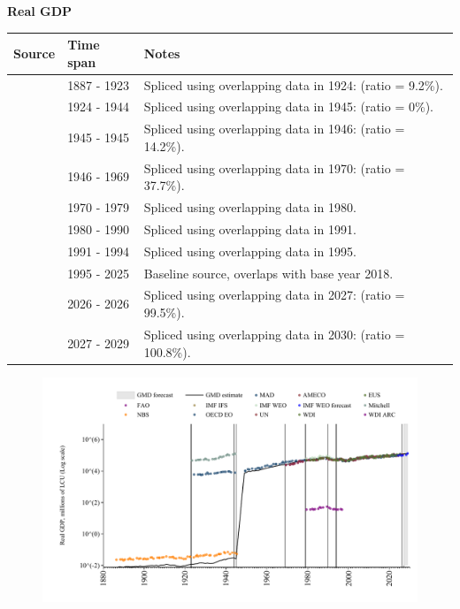 \documentclass[12pt,a4paper,landscape]{article}
\begin{document}
\begin{adjustbox}{max totalsize={\paperwidth}{\paperheight},center}
\begin{minipage}[t][\textheight][t]{\textwidth}
\vspace*{0.5cm}
{}
\begin{center}
{\Large\bfseries Real GDP}
\end{center}
\vspace{0.5cm}
\begin{table}[H]
\centering
\small
\begin{tabular}{|l|l|l|}
\hline
\textbf{Source} & \textbf{Time span} & \textbf{Notes} \\
\hline
\rowcolor{white}\cite{NBS}& 1887 - 1923 &Spliced using overlapping data in 1924: (ratio = 9.2\%). \\
\rowcolor{lightgray}\cite{Mitchell}& 1924 - 1944 &Spliced using overlapping data in 1945: (ratio = 0\%). \\
\rowcolor{white}\cite{NBS}& 1945 - 1945 &Spliced using overlapping data in 1946: (ratio = 14.2\%). \\
\rowcolor{lightgray}\cite{MAD}& 1946 - 1969 &Spliced using overlapping data in 1970: (ratio = 37.7\%). \\
\rowcolor{white}\cite{UN}& 1970 - 1979 &Spliced using overlapping data in 1980. \\
\rowcolor{lightgray}\cite{WDI}& 1980 - 1990 &Spliced using overlapping data in 1991. \\
\rowcolor{white}\cite{AMECO}& 1991 - 1994 &Spliced using overlapping data in 1995. \\
\rowcolor{lightgray}\cite{OECD_EO}& 1995 - 2025 &Baseline source, overlaps with base year 2018. \\
\rowcolor{white}\cite{AMECO}& 2026 - 2026 &Spliced using overlapping data in 2027: (ratio = 99.5\%). \\
\rowcolor{lightgray}\cite{IMF_WEO_forecast}& 2027 - 2029 &Spliced using overlapping data in 2030: (ratio = 100.8\%). \\
\hline
\end{tabular}
\end{table}
\begin{figure}[H]
\centering
\includegraphics[width=\textwidth,height=0.6\textheight,keepaspectratio]{graphs/BGR_rGDP.pdf}
\end{figure}
\end{minipage}
\end{adjustbox}
\end{document}
